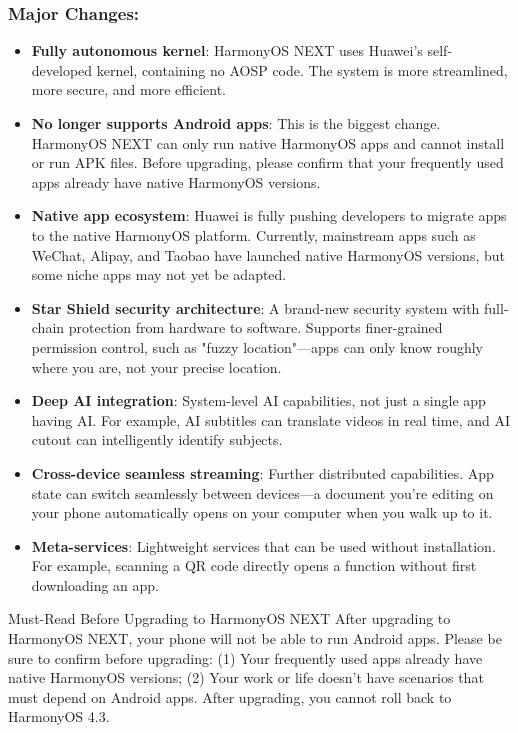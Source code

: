 \subsubsection*{Major Changes:}

\begin{itemize}
  \item \textbf{Fully autonomous kernel}: HarmonyOS NEXT uses Huawei's self-developed kernel, containing no AOSP code. The system is more streamlined, more secure, and more efficient.
  \item \textbf{No longer supports Android apps}: This is the biggest change. HarmonyOS NEXT can only run native HarmonyOS apps and cannot install or run APK files. Before upgrading, please confirm that your frequently used apps already have native HarmonyOS versions.
  \item \textbf{Native app ecosystem}: Huawei is fully pushing developers to migrate apps to the native HarmonyOS platform. Currently, mainstream apps such as WeChat, Alipay, and Taobao have launched native HarmonyOS versions, but some niche apps may not yet be adapted.
  \item \textbf{Star Shield security architecture}: A brand-new security system with full-chain protection from hardware to software. Supports finer-grained permission control, such as "fuzzy location"—apps can only know roughly where you are, not your precise location.
  \item \textbf{Deep AI integration}: System-level AI capabilities, not just a single app having AI. For example, AI subtitles can translate videos in real time, and AI cutout can intelligently identify subjects.
  \item \textbf{Cross-device seamless streaming}: Further distributed capabilities. App state can switch seamlessly between devices—a document you're editing on your phone automatically opens on your computer when you walk up to it.
  \item \textbf{Meta-services}: Lightweight services that can be used without installation. For example, scanning a QR code directly opens a function without first downloading an app.
\end{itemize}

\begin{tcbwarn}{Must-Read Before Upgrading to HarmonyOS NEXT}
After upgrading to HarmonyOS NEXT, your phone will not be able to run Android apps. Please be sure to confirm before upgrading: (1) Your frequently used apps already have native HarmonyOS versions; (2) Your work or life doesn't have scenarios that must depend on Android apps. After upgrading, you cannot roll back to HarmonyOS 4.3.

\end{tcbwarn}

